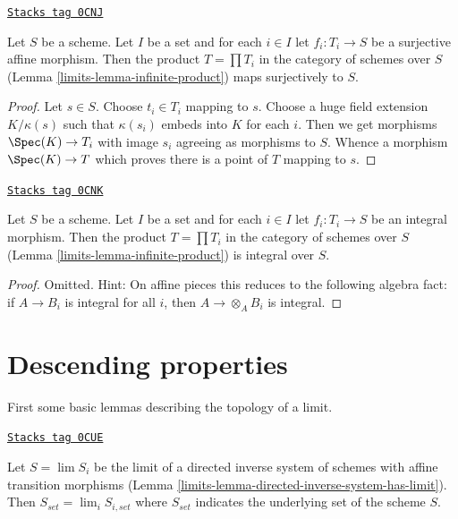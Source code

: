 \begin{lemma}
\label{limits-lemma-infinite-product-surjective}
\href{https://stacks.math.columbia.edu/tag/0CNJ}{\texttt{Stacks tag 0CNJ}}

Let $S$ be a scheme. Let $I$ be a set and for each $i \in I$
let $f_i : T_i \to S$ be a surjective affine morphism. Then the
product $T = \prod T_i$ in the category of schemes over $S$
(Lemma \ref{limits-lemma-infinite-product})
maps surjectively to $S$.
\end{lemma}

\begin{proof}
Let $s \in S$. Choose $t_i \in T_i$ mapping to $s$.
Choose a huge field extension $K/\kappa(s)$ such that
$\kappa(s_i)$ embeds into $K$ for each $i$. Then we get
morphisms $\Spec(K) \to T_i$ with image $s_i$ agreeing
as morphisms to $S$. Whence a morphism $\Spec(K) \to T$
which proves there is a point of $T$ mapping to $s$.
\end{proof}

\begin{lemma}
\label{limits-lemma-infinite-product-integral}
\href{https://stacks.math.columbia.edu/tag/0CNK}{\texttt{Stacks tag 0CNK}}

Let $S$ be a scheme. Let $I$ be a set and for each $i \in I$
let $f_i : T_i \to S$ be an integral morphism. Then the
product $T = \prod T_i$ in the category of schemes over $S$
(Lemma \ref{limits-lemma-infinite-product})
is integral over $S$.
\end{lemma}

\begin{proof}
Omitted. Hint: On affine pieces this reduces to the following
algebra fact: if $A \to B_i$ is integral for all $i$, then
$A \to \otimes_A B_i$ is integral.
\end{proof}

\section{Descending properties}
\label{limits-section-descent}
First some basic lemmas describing the topology of a limit.

\begin{lemma}
\label{limits-lemma-inverse-limit-sets}
\href{https://stacks.math.columbia.edu/tag/0CUE}{\texttt{Stacks tag 0CUE}}

Let $S = \lim S_i$ be the limit of a directed inverse system
of schemes with affine transition morphisms
(Lemma \ref{limits-lemma-directed-inverse-system-has-limit}). Then
$S_{set} = \lim_i S_{i, set}$ where $S_{set}$
indicates the underlying set of the scheme $S$.
\end{lemma}

